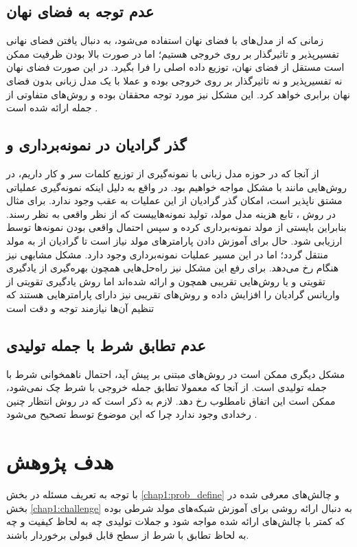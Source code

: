  \subsection{عدم توجه به فضای نهان}
 زمانی که از مدل‌های با فضای نهان استفاده می‌شود، به دنبال یافتن فضای نهانی تفسیرپذیر و تاثیرگذار بر روی خروجی \decoder{} هستیم؛ اما در صورت بالا بودن ظرفیت \decoder{} ممکن است مستقل از فضای نهان، توزیع داده اصلی را فرا بگیرد. در این صورت فضای نهان نه تفسیرپذیر و نه تاثیرگذار بر روی خروجی \decoder{} بوده و عملا با یک مدل زبانی بدون فضای نهان برابری خواهد کرد. این مشکل نیز مورد توجه محققان بوده و روش‌های متفاوتی از جمله  ارائه شده است \cite{wae, infovae, vae_lagging, vae_lossy}.
 \subsection{گذر گرادیان در نمونه‌برداری و
     }
از آنجا که در حوزه مدل زبانی با نمونه‌گیری از توزیع کلمات سر و کار داریم، در روش‌هایی مانند \gan{} با مشکل مواجه خواهیم بود. در واقع به دلیل اینکه نمونه‌گیری عملیاتی مشتق نا‌پذیر است، امکان گذر گرادیان از این عملیات به عقب وجود ندارد. برای مثال در روش \gan{}، تابع هزینه مدل مولد، تولید نمونه‌هاییست که از نظر \discriminator{} واقعی به نظر رسند. بنابراین بایستی از مولد نمونه‌برداری کرده و سپس احتمال واقعی بودن نمونه‌ها توسط \discriminator{} ارزیابی شود. حال برای آموزش دادن پارامتر‌های مولد نیاز است تا گرادیان از \discriminator{} به مولد منتقل گردد؛ اما در این مسیر عملیات نمونه‌برداری وجود دارد. مشکل مشابهی نیز هنگام \argmaxphrase{} رخ می‌دهد. برای رفع این مشکل نیز راه‌حل‌هایی همچون بهره‌گیری از یادگیری تقویتی و یا روش‌هایی تقریبی همچون  و  ارائه شده‌اند اما روش یادگیری تقویتی از واریانس گرادیان را افزایش داده و روش‌های تقریبی نیز دارای پارامتر‌هایی هستند که تنظیم آن‌ها نیازمند توجه و دقت است \cite{seqgan, gumbel}
\subsection{عدم تطابق شرط با جمله تولیدی}
مشکل دیگری ممکن است در روش‌های مبتنی بر \likelihood{} پیش آید، احتمال ناهمخوانی شرط با جمله تولیدی است. از آنجا که معمولا تطابق جمله خروجی با شرط چک نمی‌شود، ممکن است این اتفاق نامطلوب رخ دهد. لازم به ذکر است که در روش \gan{} انتظار چنین رخدادی وجود ندارد چرا که این موضوع توسط \discriminator{} تصحیح می‌شود \cite{toward}.
\section{هدف پژوهش}
با توجه به تعریف مسئله در بخش \ref{chap1:prob_define} و چالش‌های معرفی شده در بخش \ref{chap1:challenge} به دنبال ارائه روشی برای آموزش شبکه‌های مولد شرطی بوده که کمتر با چالش‌های ارائه شده مواجه شود و جملات تولیدی چه به لحاظ کیفیت و چه به لحاظ تطابق با شرط از سطح قابل قبولی برخوردار باشند.

